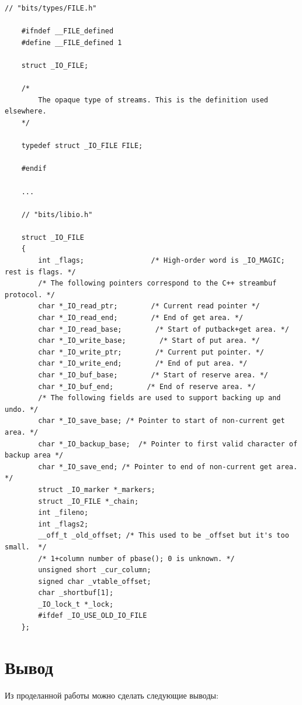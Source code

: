 \documentclass[a4paper,12pt]{article}
\begin{document}
	\begin{lstlisting}[label = lst4, caption = Структура FILE]
	// "bits/types/FILE.h"
	
	#ifndef __FILE_defined
	#define __FILE_defined 1
	
	struct _IO_FILE;
	
	/*
		The opaque type of streams. This is the definition used elsewhere.
	*/
	
	typedef struct _IO_FILE FILE;
	
	#endif
	
	...
	
	// "bits/libio.h"
	
	struct _IO_FILE
	{
		int _flags;                /* High-order word is _IO_MAGIC; rest is flags. */
		/* The following pointers correspond to the C++ streambuf protocol. */
		char *_IO_read_ptr;        /* Current read pointer */
		char *_IO_read_end;        /* End of get area. */
		char *_IO_read_base;        /* Start of putback+get area. */
		char *_IO_write_base;        /* Start of put area. */
		char *_IO_write_ptr;        /* Current put pointer. */
		char *_IO_write_end;        /* End of put area. */
		char *_IO_buf_base;        /* Start of reserve area. */
		char *_IO_buf_end;        /* End of reserve area. */
		/* The following fields are used to support backing up and undo. */
		char *_IO_save_base; /* Pointer to start of non-current get area. */
		char *_IO_backup_base;  /* Pointer to first valid character of backup area */
		char *_IO_save_end; /* Pointer to end of non-current get area. */
		struct _IO_marker *_markers;
		struct _IO_FILE *_chain;
		int _fileno;
		int _flags2;
		__off_t _old_offset; /* This used to be _offset but it's too small.  */
		/* 1+column number of pbase(); 0 is unknown. */
		unsigned short _cur_column;
		signed char _vtable_offset;
		char _shortbuf[1];
		_IO_lock_t *_lock;
		#ifdef _IO_USE_OLD_IO_FILE
	};
	\end{lstlisting}
	
	\section*{Вывод}
	
	Из проделанной работы можно сделать следующие выводы:
	
\end{document}

